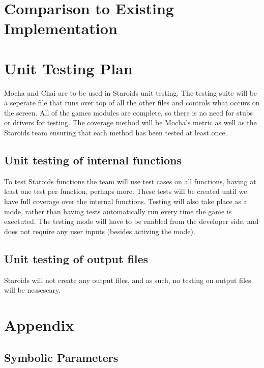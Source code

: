 \documentclass[12pt, titlepage]{article}
\begin{document}
\section{Comparison to Existing Implementation}

\section{Unit Testing Plan}
Mocha and Chai are to be used in Staroids unit testing. The testing suite will be a seperate file that runs over top of all the other files and controls what occurs on the screen. All of the games modules are complete, so there is no need for stubs or drivers for testing. The coverage method will be Mocha's metric as well as the Staroids team ensuring that each method has been tested at least once.

\subsection{Unit testing of internal functions}
To test Staroids functions the team will use test cases on all functions, having at least one test per function, perhaps more. These tests will be created until we have full coverage over the internal functions. Testing will also take place as a mode, rather than having tests automatically run every time the game is exectuted. The testing mode will have to be enabled from the developer side, and does not require any user inputs (besides activing the mode).

\subsection{Unit testing of output files}
Staroids will not create any output files, and as such, no testing on output files will be nessescary.





\newpage

\section{Appendix}


\subsection{Symbolic Parameters}
\end{document}
